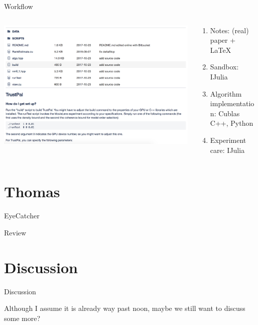 \documentclass[aspectratio=169,10pt]{beamer}
\begin{document}
\begin{frame}[fragile]{Workflow}
\begin{columns}
\begin{column}{0.6\textwidth}
\includegraphics[width=\textwidth]{img/sibyRepo.png}
\end{column}
\begin{column}{0.35\textwidth}
  \begin{enumerate}
    \item Notes: (real) paper + \LaTeX
    \item Sandbox: IJulia
    \item Algorithm implementation: Cublas C++, Python
    \item Experiment care: IJulia
\end{enumerate}  
\end{column}
\end{columns}
\end{frame}

\section{Thomas}
\begin{frame}[fragile]{EyeCatcher}
\end{frame}
\begin{frame}[t,fragile]{Review}
\end{frame}


\section{Discussion}
\begin{frame}[standout]{Discussion}
\begin{center}
    \LARGE{Although I assume it is already way past noon, maybe we still want to discuss some more?}
\end{center}
\end{frame}
\end{document}
